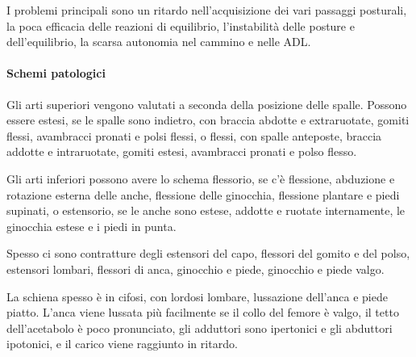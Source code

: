I problemi principali sono un ritardo nell'acquisizione dei vari passaggi posturali, la poca efficacia delle reazioni di equilibrio,
l'instabilità delle posture e dell'equilibrio, la scarsa autonomia nel cammino e nelle ADL.

\paragraph{Schemi patologici}
Gli arti superiori vengono valutati a seconda della posizione delle spalle.
Possono essere estesi, se le spalle sono indietro, con braccia abdotte e extraruotate, gomiti flessi, avambracci pronati e polsi flessi,
o flessi, con spalle anteposte, braccia addotte e intraruotate, gomiti estesi, avambracci pronati e polso flesso.

Gli arti inferiori possono avere lo schema flessorio, se c'è flessione, abduzione e rotazione esterna delle anche, flessione delle
ginocchia, flessione plantare e piedi supinati, o estensorio, se le anche sono estese, addotte e ruotate internamente, le ginocchia
estese e i piedi in punta.

Spesso ci sono contratture degli estensori del capo, flessori del gomito e del polso, estensori lombari, flessori di anca, ginocchio e
piede, ginocchio e piede valgo.

La schiena spesso è in cifosi, con lordosi lombare, lussazione dell'anca e piede piatto. L'anca viene lussata più facilmente se il collo
del femore è valgo, il tetto dell'acetabolo è poco pronunciato, gli adduttori sono ipertonici e gli abduttori ipotonici, e il carico
viene raggiunto in ritardo.
